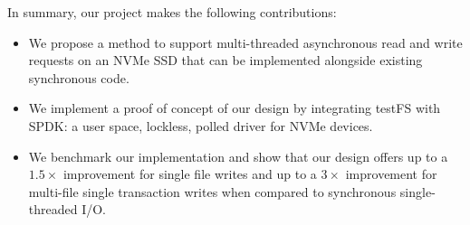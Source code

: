 \vspace{1em}
\noindent
In summary, our project makes the following contributions:
\begin{itemize}
  \item We propose a method to support multi-threaded asynchronous read and
    write requests on an NVMe SSD that can be implemented alongside existing
    synchronous code.
  \item We implement a proof of concept of our design by integrating testFS
    with SPDK: a user space, lockless, polled driver for NVMe devices.
  \item We benchmark our implementation and show that our design offers up to a
    $1.5\times$ improvement for single file writes and up to a $3\times$
    improvement for multi-file single transaction writes when compared to
    synchronous single-threaded I/O.
\end{itemize}
